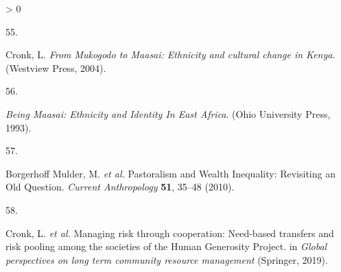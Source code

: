 \documentclass[
]{article}
\newlength{\cslhangindent}
\newlength{\csllabelwidth}
\newenvironment{CSLReferences}[2] %
 {%
  \setlength{\parindent}{0pt}
  \ifodd #1 \everypar{\setlength{\hangindent}{\cslhangindent}}\ignorespaces\fi
  \ifnum #2 > 0
  \setlength{\parskip}{#2\baselineskip}
  \fi
 }%
 {}
\newcommand{\CSLLeftMargin}[1]{\parbox[t]{\csllabelwidth}{#1}}
\newcommand{\CSLRightInline}[1]{\parbox[t]{\linewidth - \csllabelwidth}{#1}\break}
\begin{document}
\begin{CSLReferences}{0}{0}
\leavevmode\hypertarget{ref-cronkMukogodoMaasaiEthnicity2004}{}%
\CSLLeftMargin{55. }
\CSLRightInline{Cronk, L. \emph{From {Mukogodo} to {Maasai}: Ethnicity and cultural change in {Kenya}}. ({Westview Press}, 2004).}

\leavevmode\hypertarget{ref-spearBeingMaasaiEthnicity1993a}{}%
\CSLLeftMargin{56. }
\CSLRightInline{\emph{Being {Maasai}: {Ethnicity} and {Identity In East Africa}}. ({Ohio University Press}, 1993).}

\leavevmode\hypertarget{ref-borgerhoffmulderPastoralismWealthInequality2010}{}%
\CSLLeftMargin{57. }
\CSLRightInline{Borgerhoff Mulder, M. \emph{et al.} Pastoralism and {Wealth Inequality}: {Revisiting} an {Old Question}. \emph{Current Anthropology} \textbf{51}, 35--48 (2010).}

\leavevmode\hypertarget{ref-cronkManagingRiskCooperationinpress}{}%
\CSLLeftMargin{58. }
\CSLRightInline{Cronk, L. \emph{et al.} Managing risk through cooperation: {Need}-based transfers and risk pooling among the societies of the {Human Generosity Project}. in \emph{Global perspectives on long term community resource management} ({Springer}, 2019).}

\end{CSLReferences}
\end{document}

